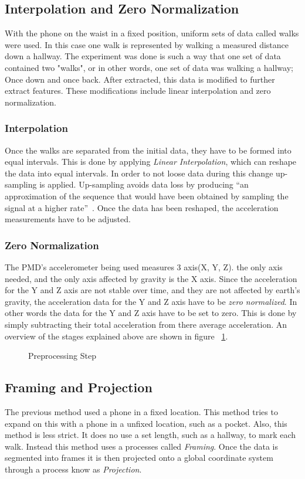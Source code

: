 \documentclass{sig-alternate}
\begin{document}
\subsection{Interpolation and Zero Normalization}	
	With the phone on the waist in a fixed position, uniform sets of data called walks were used. In this case one walk is represented by walking a measured distance down a hallway. The experiment was done is such a way that one set of data contained two "walks", or in other words, one set of data was walking a hallway; Once down and once back. After extracted, this data is modified to further extract features. These modifications include linear interpolation and zero normalization. 
	
\subsubsection{Interpolation} 
	Once the walks are separated from the initial data, they have to be formed into equal intervals. This is done by applying \textit{Linear Interpolation}, which can reshape the data  into equal intervals. In order to not loose data during this change up-sampling is applied. Up-sampling avoids data loss by producing ``an approximation of the sequence that would have been obtained by sampling the signal at a higher rate''~\cite{wiki1:2014}. Once the data has been reshaped, the acceleration measurements have to be adjusted. 
	
\subsubsection{Zero Normalization}
	The PMD's accelerometer being used measures 3 axis(X, Y, Z). the only axis needed, and the only axis affected by gravity is the X axis. Since the acceleration for the Y and Z axis are not stable over time, and they are not affected by earth's gravity, the acceleration data for the Y and Z axis have to be \textit{zero normalized}. In other words the data for the Y and Z axis have to be set to zero. This is done by simply subtracting their total acceleration from there average acceleration. An overview of the stages explained above are shown in figure ~\ref{fig:firstStep}.

\begin{figure}
\centering
{}
\caption{Preprocessing Step}
\label{fig:firstStep}
\end{figure}

\subsection{Framing and Projection}{
	The previous method used a phone in a fixed location. This method tries to expand on this with a phone in a unfixed location, such as a pocket. Also, this method is less strict. It does no use a set length, such as a hallway, to mark each walk. Instead this method uses a processes called \textit{Framing}. Once the data is segmented into frames it is then projected onto a global coordinate system through a process know as \textit{Projection}.
	}
\end{document}

